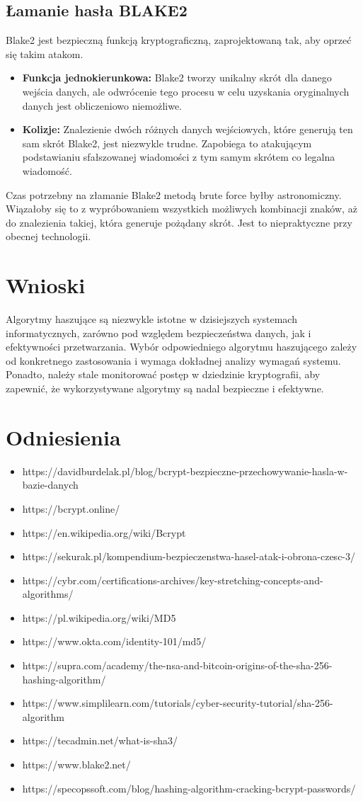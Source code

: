 \documentclass[12pt, a4paper]{article}
\begin{document}
\subsection{Łamanie hasła BLAKE2}
Blake2 jest bezpieczną funkcją kryptograficzną, zaprojektowaną tak, aby oprzeć się takim atakom.
\begin{itemize}
\item \textbf{Funkcja jednokierunkowa:} Blake2 tworzy unikalny skrót dla danego wejścia danych, ale odwrócenie tego procesu w celu uzyskania oryginalnych danych jest obliczeniowo niemożliwe.
\item \textbf{Kolizje:} Znalezienie dwóch różnych danych wejściowych, które generują ten sam skrót Blake2, jest niezwykle trudne. Zapobiega to atakującym podstawianiu sfałszowanej wiadomości z tym samym skrótem co legalna wiadomość.
\end{itemize}
Czas potrzebny na złamanie Blake2 metodą brute force byłby astronomiczny. Wiązałoby się to z wypróbowaniem wszystkich możliwych kombinacji znaków, aż do znalezienia takiej, która generuje pożądany skrót. Jest to niepraktyczne przy obecnej technologii.
\section{Wnioski}
Algorytmy haszujące są niezwykle istotne w dzisiejszych systemach informatycznych, zarówno pod względem bezpieczeństwa danych, jak i efektywności przetwarzania. Wybór odpowiedniego algorytmu haszującego zależy od konkretnego zastosowania i wymaga dokładnej analizy wymagań systemu. Ponadto, należy stale monitorować postęp w dziedzinie kryptografii, aby zapewnić, że wykorzystywane algorytmy są nadal bezpieczne i efektywne.
\section{Odniesienia}

\begin{itemize}
\item https://davidburdelak.pl/blog/bcrypt-bezpieczne-przechowywanie-hasla-w-bazie-danych
\item https://bcrypt.online/
\item https://en.wikipedia.org/wiki/Bcrypt
\item https://sekurak.pl/kompendium-bezpieczenstwa-hasel-atak-i-obrona-czesc-3/
\item https://cybr.com/certifications-archives/key-stretching-concepts-and-algorithms/
\item https://pl.wikipedia.org/wiki/MD5
\item https://www.okta.com/identity-101/md5/
\item https://supra.com/academy/the-nsa-and-bitcoin-origins-of-the-sha-256-hashing-algorithm/
\item https://www.simplilearn.com/tutorials/cyber-security-tutorial/sha-256-algorithm
\item https://tecadmin.net/what-is-sha3/
\item https://www.blake2.net/
\item https://specopssoft.com/blog/hashing-algorithm-cracking-bcrypt-passwords/
\end{itemize}
\end{document}
